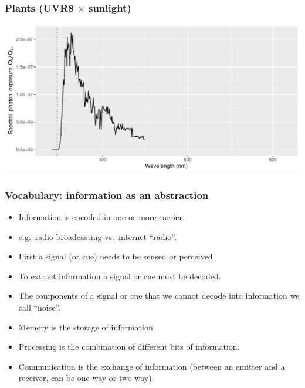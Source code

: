 \documentclass[11pt]{beamer}\usepackage[]{graphicx}\usepackage[]{xcolor}
\makeatletter
\newenvironment{kframe}{%
 \def\at@end@of@kframe{}%
 \ifinner\ifhmode%
  \def\at@end@of@kframe{\end{minipage}}%
  \begin{minipage}{\columnwidth}%
 \fi\fi%
 \def\FrameCommand##1{\hskip\@totalleftmargin \hskip-\fboxsep
 \colorbox{shadecolor}{##1}\hskip-\fboxsep
     \hskip-\linewidth \hskip-\@totalleftmargin \hskip\columnwidth}%
 \MakeFramed {\advance\hsize-\width
   \@totalleftmargin\z@ \linewidth\hsize
   \@setminipage}}%
 {\par\unskip\endMakeFramed%
 \at@end@of@kframe}
\newenvironment{knitrout}{}{} %
\makeatother
\begin{document}
\begin{frame}
\frametitle{Plants (UVR8 $\times$ sunlight)}
\begin{knitrout}\scriptsize
{}\color{fgcolor}\begin{kframe}


{\ttfamily\noindent{}}\end{kframe}

{\centering \includegraphics[width=.95\textwidth]{figure/pos-plant-vision-4-1} 

}


\end{knitrout}
\end{frame}


\begin{frame}%
  \frametitle{Vocabulary: information as an abstraction}
  \begin{itemize}
    \item Information is encoded in one or more carrier.
    \item e.g.\ radio broadcasting vs.\ internet-``radio''.
    \item First a signal (or cue) needs to be sensed or perceived.
    \item To extract information a signal or cue must be decoded.
    \item The components of a signal or cue that we cannot decode into information we call ``noise''.
    \item Memory is the storage of information.
    \item Processing is the combination of different bits of information.
    \item Communication is the exchange of information (between an emitter and a receiver, can be one-way or two way).
  \end{itemize}
\end{frame}
\end{document}
